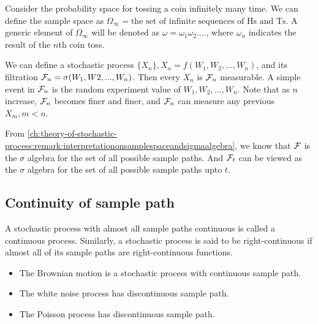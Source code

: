 \begin{refsection}
\begin{example}
Consider the probability space for tossing a coin infinitely many time. We can define the sample space as $\Omega_\infty = \text{the set of infinite sequences of Hs and Ts}$. A generic element of $\Omega_\infty$ will be denoted as $\omega=\omega_1\omega_2....$, where $\omega_n$ indicates the result of the $n$th coin toss.

We can define a stochastic process $\{X_n\}, X_n=f(W_1,W_2,...,W_n)$, and its filtration $\mathcal{F}_n=\sigma(W_1,W2,...,W_n)$. Then every $X_n$ is $\mathcal{F}_n$ measurable. A simple event in $\mathcal{F}_n$ is the random experiment value of $W_1,W_2,...,W_n$. Note that as $n$ increase, $\mathcal{F}_n$ becomes finer and finer, and $\mathcal{F}_n$ can measure any previous $X_m,m<n$.	
\end{example}


\begin{remark}
From \autoref{ch:theory-of-stochastic-process:remark:interpretationonsamplespaceandsigmaalgebra}, we know that $\mathcal{F}$ is the $\sigma$ algebra for the set of all possible sample paths. And $\mathcal{F}_t$ can be viewed as the $\sigma$ algebra for the set of all possible sample paths upto $t$. 	
	
\end{remark}


\subsection{Continuity of sample path}
\begin{definition}
	A stochastic process with almost all sample paths continuous is called a continuous process. Similarly, a stochastic process is said to be right-continuous if almost all of its sample paths are right-continuous functions.
\end{definition}

\begin{example}\hfill
	\begin{itemize}
		\item The Brownian motion is a stochastic process with continuous sample path.
		\item The white noise process has discontinuous sample path. 
		\item The Poisson process has discontinuous sample path.
	\end{itemize}
\end{example}


\end{refsection}
